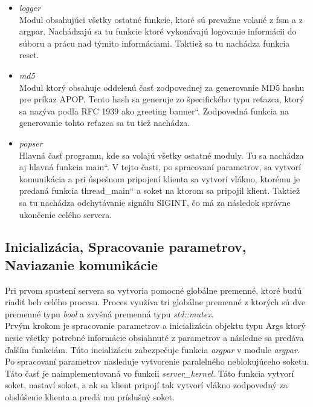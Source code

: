 \documentclass[11pt,a4paper]{article}
\providecommand{\uv}[1]{\quotedblbase #1\textquotedblleft}
\begin{document}
\begin{itemize}
			\item \textit{logger}\\[0.4em]
				Modul obsahujúci všetky ostatné funkcie, ktoré sú prevažne volané z fsm a z argpar. Nachádzajú sa tu funkcie ktoré vykonávajú logovanie informácii do súboru a prácu nad týmito informáciami. Taktiež sa tu nachádza funkcia reset.

			\item \textit{md5}\\[0.4em]
				Modul ktorý obsahuje oddelenú časť zodpovednej za generovanie MD5 hashu pre príkaz APOP. Tento hash sa generuje zo špecifického typu reťazca, ktorý sa nazýva podľa RFC 1939 ako \uv{greeting banner}. Zodpovedná funkcia na generovanie tohto reťazca sa tu tiež nachádza.

			\item \textit{popser}\\[0.4em]
				Hlavná časť programu, kde sa volajú všetky ostatné moduly. Tu sa nachádza aj hlavná funkcia \uv{main}. V tejto časti, po spracovaní parametrov, sa vytvorí komunikácia a pri úspešnom pripojení klienta sa vytvorí vlákno, ktorému je predaná funkcia \uv{thread\_main} a soket na ktorom sa pripojil klient. Taktiež sa tu nachádza odchytávanie signálu SIGINT, čo má za následok správne ukončenie celého servera.

		\end{itemize}

	\subsection{Inicializácia, Spracovanie parametrov, Naviazanie komunikácie}
		\indent Pri prvom spustení servera sa vytvoria pomocné globálne premenné, ktoré budú riadiť beh celého procesu. Proces využíva tri globálne premenné z ktorých sú dve premenné typu \textit{bool} a zvyšná premenná typu \textit{std::mutex}.\\[0.4em]
		\indent Prvým krokom je spracovanie parametrov a inicializácia objektu typu Args ktorý nesie všetky potrebné informácie obsiahnuté z parametrov a následne sa predáva ďalším funkciám. Túto incializáciu zabezpečuje funkcia \textit{argpar} v module \textit{argpar}.\\[0.4em]
		\indent Po spracovaní parametrov nasleduje vytvorenie paralelného neblokujúceho soketu. Táto časť je naimplementovaná vo funkcii \textit{server\_kernel}. Táto funkcia vytvorí soket, nastaví soket, a ak sa klient pripojí tak vytvorí vlákno zodpovedný za obslúšenie klienta a predá mu príslušný soket.
\end{document}

